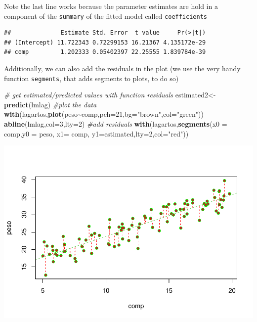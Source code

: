 \documentclass[
]{book}
\newenvironment{Shaded}{\begin{snugshade}}{\end{snugshade}}
\newcommand{\AttributeTok}[1]{\textcolor[rgb]{0.13,0.29,0.53}{#1}}
\newcommand{\CommentTok}[1]{\textcolor[rgb]{0.56,0.35,0.01}{\textit{#1}}}
\newcommand{\DecValTok}[1]{\textcolor[rgb]{0.00,0.00,0.81}{#1}}
\newcommand{\FunctionTok}[1]{\textcolor[rgb]{0.13,0.29,0.53}{\textbf{#1}}}
\newcommand{\NormalTok}[1]{#1}
\newcommand{\OtherTok}[1]{\textcolor[rgb]{0.56,0.35,0.01}{#1}}
\newcommand{\SpecialCharTok}[1]{\textcolor[rgb]{0.81,0.36,0.00}{\textbf{#1}}}
\newcommand{\StringTok}[1]{\textcolor[rgb]{0.31,0.60,0.02}{#1}}
\begin{document}
Note the last line works because the parameter estimates are hold in a component of the \texttt{summary} of the fitted model called \texttt{coefficients}

\begin{Shaded}
\end{Shaded}

\begin{verbatim}
##              Estimate Std. Error  t value     Pr(>|t|)
## (Intercept) 11.722343 0.72299153 16.21367 4.135172e-29
## comp         1.202333 0.05402397 22.25555 1.839784e-39
\end{verbatim}

Additionally, we can also add the residuals in the plot (we use the very handy function \texttt{segments}, that adds segments to plots, to do so)

\begin{Shaded}
\begin{Highlighting}[]
\CommentTok{\# get estimated/predicted values with function residuals}
\NormalTok{estimated2}\OtherTok{\textless{}{-}}\FunctionTok{predict}\NormalTok{(lmlag)}
\CommentTok{\#plot the data}
\FunctionTok{with}\NormalTok{(lagartos,}\FunctionTok{plot}\NormalTok{(peso}\SpecialCharTok{\textasciitilde{}}\NormalTok{comp,}\AttributeTok{pch=}\DecValTok{21}\NormalTok{,}\AttributeTok{bg=}\StringTok{"brown"}\NormalTok{,}\AttributeTok{col=}\StringTok{"green"}\NormalTok{))}
\FunctionTok{abline}\NormalTok{(lmlag,}\AttributeTok{col=}\DecValTok{3}\NormalTok{,}\AttributeTok{lty=}\DecValTok{2}\NormalTok{)}
\CommentTok{\#add residuals}
\FunctionTok{with}\NormalTok{(lagartos,}\FunctionTok{segments}\NormalTok{(}\AttributeTok{x0 =}\NormalTok{ comp,}\AttributeTok{y0 =}\NormalTok{ peso, }\AttributeTok{x1=}\NormalTok{ comp, }\AttributeTok{y1=}\NormalTok{estimated,}\AttributeTok{lty=}\DecValTok{2}\NormalTok{,}\AttributeTok{col=}\StringTok{"red"}\NormalTok{))}
\end{Highlighting}
\end{Shaded}

\includegraphics{ECOMODbook_files/figure-latex/a6.11-1.pdf}
\end{document}
